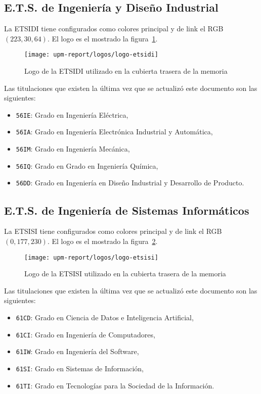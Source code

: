 \documentclass[%
    school=etsisi,%
    type=pfm,%
    degree=MAADM,%
]{upm-report}
\begin{document}
\subsection{E.T.S. de Ingeniería y Diseño Industrial}

La ETSIDI tiene configurados como colores principal y de link el RGB $(223,30,64)$. El logo es el mostrado la figura~\ref{fig:logo-etsidi}.

\begin{figure}[ht]
    \centering
    \texttt{[image: upm-report/logos/logo-etsidi]}
    \caption{\label{fig:logo-etsidi}Logo de la ETSIDI utilizado en la cubierta trasera de la memoria}
\end{figure}

Las titulaciones que existen la última vez que se actualizó este documento son las siguientes:

\begin{itemize}
    \item \texttt{56IE}: Grado en Ingeniería Eléctrica,
    \item \texttt{56IA}: Grado en Ingeniería Electrónica Industrial y Automática,
    \item \texttt{56IM}: Grado en Ingeniería Mecánica,
    \item \texttt{56IQ}: Grado en Grado en Ingeniería Química,
    \item \texttt{56DD}: Grado en Ingeniería en Diseño Industrial y Desarrollo de Producto.
\end{itemize}

\subsection{E.T.S. de Ingeniería de Sistemas Informáticos}

La ETSISI tiene configurados como colores principal y de link el RGB $(0,177,230)$. El logo es el mostrado la figura~\ref{fig:logo-etsisi}.

\begin{figure}[ht]
    \centering
    \texttt{[image: upm-report/logos/logo-etsisi]}
    \caption{\label{fig:logo-etsisi}Logo de la ETSISI utilizado en la cubierta trasera de la memoria}
\end{figure}

Las titulaciones que existen la última vez que se actualizó este documento son las siguientes:

\begin{itemize}
    \item \texttt{61CD}: Grado en Ciencia de Datos e Inteligencia Artificial,
    \item \texttt{61CI}: Grado en Ingeniería de Computadores,
    \item \texttt{61IW}: Grado en Ingeniería del Software,
    \item \texttt{61SI}: Grado en Sistemas de Información,
    \item \texttt{61TI}: Grado en Tecnologías para la Sociedad de la Información.
\end{itemize}
\end{document}
